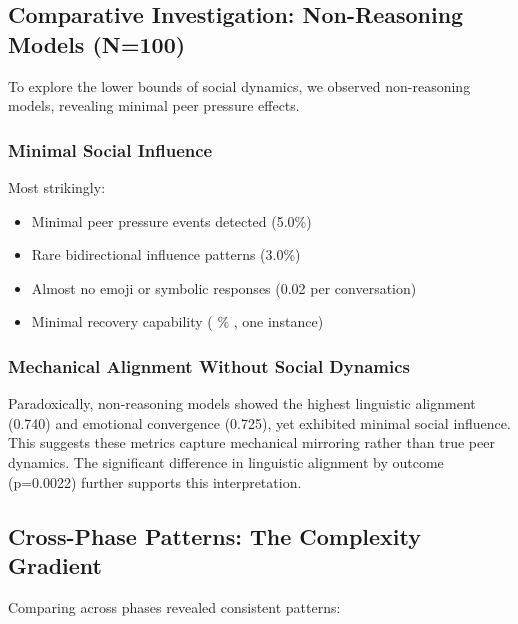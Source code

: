 \documentclass[11pt,letterpaper]{article}
\newcommand{\expthreeTotalSessionsRaw}{100}
\newcommand{\expthreeRecoverySessionsRaw}{1}
\newcommand{\expthreeTotalSessions}{N=\expthreeTotalSessionsRaw}
\newcommand{\expthreeRecoveryPercentage}{%
  \fpeval{round(\expthreeRecoverySessionsRaw / \expthreeTotalSessionsRaw * 100, 1)}\%
}
\newcommand{\expthreePeerPressurePercentage}{5.0\%}
\newcommand{\expthreeBidirectionalPercentage}{3.0\%}
\newcommand{\expthreeAvgEmojiPerConv}{0.02}
\newcommand{\expthreeAverageLinguisticAlignment}{0.740}
\newcommand{\expthreeAverageEmotionalConvergence}{0.725}
\newcommand{\expthreeLinguisticAlignmentPValue}{p=0.0022}
\begin{document}
\subsection{Comparative Investigation: Non-Reasoning Models (\expthreeTotalSessions{})}

To explore the lower bounds of social dynamics, we observed non-reasoning models, revealing minimal peer pressure effects.

\subsubsection{Minimal Social Influence}

Most strikingly:
\begin{itemize}
    \item Minimal peer pressure events detected (\expthreePeerPressurePercentage{})
    \item Rare bidirectional influence patterns (\expthreeBidirectionalPercentage{})
    \item Almost no emoji or symbolic responses (\expthreeAvgEmojiPerConv{} per conversation)
    \item Minimal recovery capability (\expthreeRecoveryPercentage{}, one instance)
\end{itemize}

\subsubsection{Mechanical Alignment Without Social Dynamics}

Paradoxically, non-reasoning models showed the highest linguistic alignment (\expthreeAverageLinguisticAlignment{}) and emotional convergence (\expthreeAverageEmotionalConvergence{}), yet exhibited minimal social influence. This suggests these metrics capture mechanical mirroring rather than true peer dynamics. The significant difference in linguistic alignment by outcome (\expthreeLinguisticAlignmentPValue{}) further supports this interpretation.

\subsection{Cross-Phase Patterns: The Complexity Gradient}

Comparing across phases revealed consistent patterns:
\end{document}
